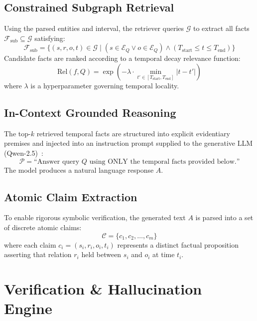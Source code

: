 \documentclass[conference]{IEEEtran}
\begin{document}
\subsection{Constrained Subgraph Retrieval}
Using the parsed entities and interval, the retriever queries $\mathcal{G}$ to extract all facts $\mathcal{F}_{\mathrm{sub}} \subseteq \mathcal{G}$ satisfying:
\begin{equation}
\mathcal{F}_{\mathrm{sub}} = \{(s, r, o, t) \in \mathcal{G} \mid (s \in \mathcal{E}_Q \lor o \in \mathcal{E}_Q) \land (T_{\mathrm{start}} \le t \le T_{\mathrm{end}})\}
\end{equation}
Candidate facts are ranked according to a temporal decay relevance function:
\begin{equation}
\mathrm{Rel}(f, Q) = \exp\left(-\lambda \cdot \min_{t' \in [T_{\mathrm{start}}, T_{\mathrm{end}}]} |t - t'|\right)
\end{equation}
where $\lambda$ is a hyperparameter governing temporal locality.

\subsection{In-Context Grounded Reasoning}
The top-$k$ retrieved temporal facts are structured into explicit evidentiary premises and injected into an instruction prompt supplied to the generative LLM (Qwen-2.5)~\cite{yang2024qwen2}:
\begin{equation}
\mathcal{P} = \text{``Answer query } Q \text{ using ONLY the temporal facts provided below.''}
\end{equation}
The model produces a natural language response $A$.

\subsection{Atomic Claim Extraction}
To enable rigorous symbolic verification, the generated text $A$ is parsed into a set of discrete atomic claims:
\begin{equation}
\mathcal{C} = \{c_1, c_2, \dots, c_m\}
\end{equation}
where each claim $c_i = (s_i, r_i, o_i, t_i)$ represents a distinct factual proposition asserting that relation $r_i$ held between $s_i$ and $o_i$ at time $t_i$.

\section{Verification & Hallucination Engine}
\end{document}
